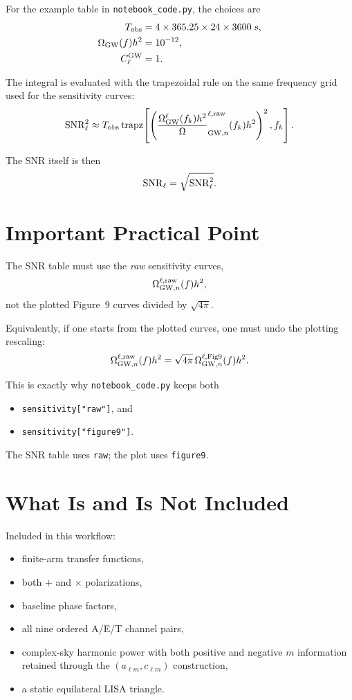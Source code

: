 \documentclass[11pt]{article}
\begin{document}
For the example table in \texttt{notebook\_code.py}, the choices are
\begin{align}
T_{\rm obs} &= 4\times 365.25\times 24\times 3600~\mathrm{s}, \\
\Omega_{\rm GW}(f) h^2 &= 10^{-12}, \\
C_\ell^{\rm GW} &= 1.
\end{align}

The integral is evaluated with the trapezoidal rule on the same frequency grid used for the sensitivity curves:
\begin{equation}
{\rm SNR}_\ell^2
\approx
T_{\rm obs}
\operatorname{trapz}\!\left[
\left(
\frac{\Omega_{\rm GW}^{\ell}(f_k) h^2}
\Omega_{{\rm GW},n}^{\ell,{\rm raw}}(f_k) h^2
\right)^2,
f_k
\right].
\end{equation}

The SNR itself is then
\begin{equation}
{\rm SNR}_\ell = \sqrt{{\rm SNR}_\ell^2}.
\end{equation}

\section{Important Practical Point}
The SNR table must use the \emph{raw} sensitivity curves,
\begin{equation}
\Omega_{{\rm GW},n}^{\ell,{\rm raw}}(f) h^2,
\end{equation}
not the plotted Figure~9 curves divided by $\sqrt{4\pi}$.

Equivalently, if one starts from the plotted curves, one must undo the plotting rescaling:
\begin{equation}
\Omega_{{\rm GW},n}^{\ell,{\rm raw}}(f) h^2
=
\sqrt{4\pi}\,
\Omega_{{\rm GW},n}^{\ell,{\rm Fig9}}(f) h^2.
\end{equation}

This is exactly why \texttt{notebook\_code.py} keeps both
\begin{itemize}
\item \texttt{sensitivity["raw"]}, and
\item \texttt{sensitivity["figure9"]}.
\end{itemize}
The SNR table uses \texttt{raw}; the plot uses \texttt{figure9}.

\section{What Is and Is Not Included}
Included in this workflow:
\begin{itemize}
\item finite-arm transfer functions,
\item both $+$ and $\times$ polarizations,
\item baseline phase factors,
\item all nine ordered A/E/T channel pairs,
\item complex-sky harmonic power with both positive and negative $m$ information retained through the $(a_{\ell m},c_{\ell m})$ construction,
\item a static equilateral LISA triangle.
\end{itemize}
\end{document}
